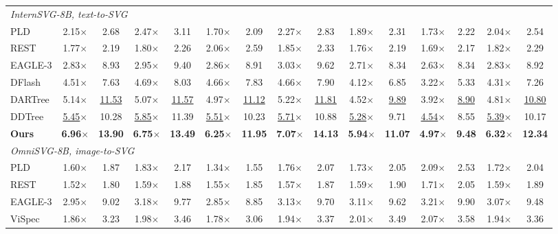 \begin{table}[t]
\begin{tabular*}{\textwidth}{@{\extracolsep{\fill}}l*{14}{c}@{}}
\midrule
\multicolumn{15}{l}{\textit{InternSVG-8B, text-to-SVG}} \\
PLD & 2.15$\times$ & 2.68 & 2.47$\times$ & 3.11 & 1.70$\times$ & 2.09 & 2.27$\times$ & 2.83 & 1.89$\times$ & 2.31 & 1.73$\times$ & 2.22 & 2.04$\times$ & 2.54 \\
REST & 1.77$\times$ & 2.19 & 1.80$\times$ & 2.26 & 2.06$\times$ & 2.59 & 1.85$\times$ & 2.33 & 1.76$\times$ & 2.19 & 1.69$\times$ & 2.17 & 1.82$\times$ & 2.29 \\
EAGLE-3 & 2.83$\times$ & 8.93 & 2.95$\times$ & 9.40 & 2.86$\times$ & 8.91 & 3.03$\times$ & 9.62 & 2.71$\times$ & 8.34 & 2.63$\times$ & 8.34 & 2.83$\times$ & 8.92 \\
DFlash & 4.51$\times$ & 7.63 & 4.69$\times$ & 8.03 & 4.66$\times$ & 7.83 & 4.66$\times$ & 7.90 & 4.12$\times$ & 6.85 & 3.22$\times$ & 5.33 & 4.31$\times$ & 7.26 \\
DARTree & 5.14$\times$ & \underline{11.53} & 5.07$\times$ & \underline{11.57} & 4.97$\times$ & \underline{11.12} & 5.22$\times$ & \underline{11.81} & 4.52$\times$ & \underline{9.89} & 3.92$\times$ & \underline{8.90} & 4.81$\times$ & \underline{10.80} \\
DDTree & \underline{5.45}$\times$ & 10.28 & \underline{5.85}$\times$ & 11.39 & \underline{5.51}$\times$ & 10.23 & \underline{5.71}$\times$ & 10.88 & \underline{5.28}$\times$ & 9.71 & \underline{4.54}$\times$ & 8.55 & \underline{5.39}$\times$ & 10.17 \\
\textbf{Ours} & \textbf{6.96}$\times$ & \textbf{13.90} & \textbf{6.75}$\times$ & \textbf{13.49} & \textbf{6.25}$\times$ & \textbf{11.95} & \textbf{7.07}$\times$ & \textbf{14.13} & \textbf{5.94}$\times$ & \textbf{11.07} & \textbf{4.97}$\times$ & \textbf{9.48} & \textbf{6.32}$\times$ & \textbf{12.34} \\
\midrule
\multicolumn{15}{l}{\textit{OmniSVG-8B, image-to-SVG}} \\
PLD & 1.60$\times$ & 1.87 & 1.83$\times$ & 2.17 & 1.34$\times$ & 1.55 & 1.76$\times$ & 2.07 & 1.73$\times$ & 2.05 & 2.09$\times$ & 2.53 & 1.72$\times$ & 2.04 \\
REST & 1.52$\times$ & 1.80 & 1.59$\times$ & 1.88 & 1.55$\times$ & 1.85 & 1.57$\times$ & 1.87 & 1.59$\times$ & 1.90 & 1.71$\times$ & 2.05 & 1.59$\times$ & 1.89 \\
EAGLE-3 & 2.95$\times$ & 9.02 & 3.18$\times$ & 9.77 & 2.85$\times$ & 8.85 & 3.13$\times$ & 9.70 & 3.11$\times$ & 9.62 & 3.21$\times$ & 9.90 & 3.07$\times$ & 9.48 \\
ViSpec & 1.86$\times$ & 3.23 & 1.98$\times$ & 3.46 & 1.78$\times$ & 3.06 & 1.94$\times$ & 3.37 & 2.01$\times$ & 3.49 & 2.07$\times$ & 3.58 & 1.94$\times$ & 3.36 \\

\end{tabular*}
\end{table}
